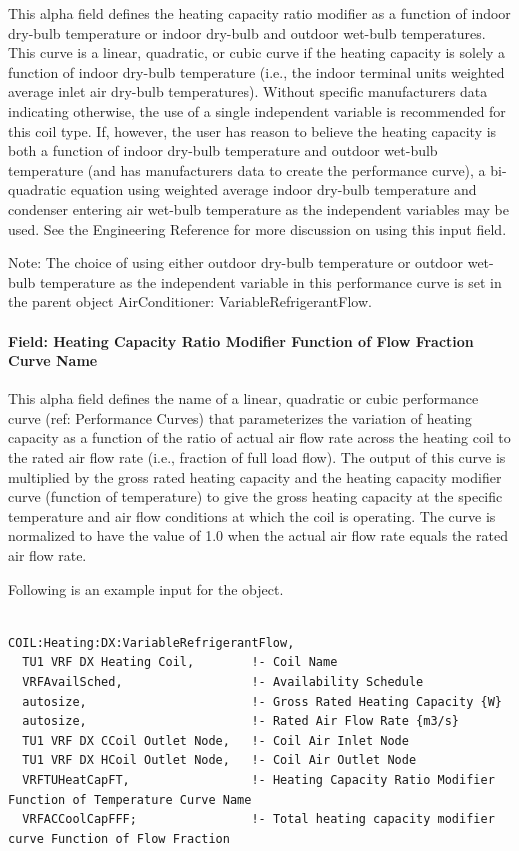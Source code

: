 This alpha field defines the heating capacity ratio modifier as a function of indoor dry-bulb temperature or indoor dry-bulb and outdoor wet-bulb temperatures. This curve is a linear, quadratic, or cubic curve if the heating capacity is solely a function of indoor dry-bulb temperature (i.e., the indoor terminal units weighted average inlet air dry-bulb temperatures). Without specific manufacturers data indicating otherwise, the use of a single independent variable is recommended for this coil type. If, however, the user has reason to believe the heating capacity is both a function of indoor dry-bulb temperature and outdoor wet-bulb temperature (and has manufacturers data to create the performance curve), a bi-quadratic equation using weighted average indoor dry-bulb temperature and condenser entering air wet-bulb temperature as the independent variables may be used. See the Engineering Reference for more discussion on using this input field.

Note: The choice of using either outdoor dry-bulb temperature or outdoor wet-bulb temperature as the independent variable in this performance curve is set in the parent object AirConditioner: VariableRefrigerantFlow.

\paragraph{Field: Heating Capacity Ratio Modifier Function of Flow Fraction Curve Name}\label{field-heating-capacity-ratio-modifier-function-of-flow-fraction-curve-name}

This alpha field defines the name of a linear, quadratic or cubic performance curve (ref: Performance Curves) that parameterizes the variation of heating capacity as a function of the ratio of actual air flow rate across the heating coil to the rated air flow rate (i.e., fraction of full load flow). The output of this curve is multiplied by the gross rated heating capacity and the heating capacity modifier curve (function of temperature) to give the gross heating capacity at the specific temperature and air flow conditions at which the coil is operating. The curve is normalized to have the value of 1.0 when the actual air flow rate equals the rated air flow rate.

Following is an example input for the object.

\begin{lstlisting}

COIL:Heating:DX:VariableRefrigerantFlow,
  TU1 VRF DX Heating Coil,        !- Coil Name
  VRFAvailSched,                  !- Availability Schedule
  autosize,                       !- Gross Rated Heating Capacity {W}
  autosize,                       !- Rated Air Flow Rate {m3/s}
  TU1 VRF DX CCoil Outlet Node,   !- Coil Air Inlet Node
  TU1 VRF DX HCoil Outlet Node,   !- Coil Air Outlet Node
  VRFTUHeatCapFT,                 !- Heating Capacity Ratio Modifier Function of Temperature Curve Name
  VRFACCoolCapFFF;                !- Total heating capacity modifier curve Function of Flow Fraction
\end{lstlisting}

